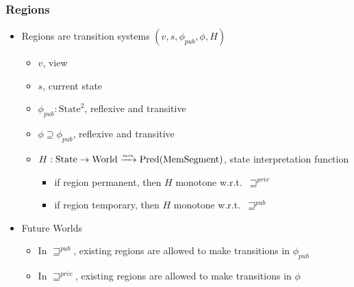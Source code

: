 \documentclass{beamer}
\newcommand{\monfun}{\xrightarrow{\textit{\tiny{mon}}}}
\newcommand{\fun}{\rightarrow}
\newcommand{\var}[1]{\mathit{#1}}
\newcommand{\futurewk}{\mathbin{\sqsupseteq}^{\var{pub}}}
\newcommand{\futurestr}{\mathbin{\sqsupseteq}^{\var{priv}}}
\newcommand{\plaindom}[1]{\mathrm{#1}}
\newcommand{\HeapSegments}{\plaindom{MemSegment}}
\newcommand{\States}{\plaindom{State}}
\newcommand{\Worlds}{\plaindom{World}}
\newcommand{\UPred}[1]{\plaindom{Pred}(#1)}
\begin{document}
\begin{frame}
  \frametitle{Regions}
  \begin{itemize}[<+->]
  \item Regions are transition systems $(v,s,\phi_{\var{pub}},\phi,H)$
    \begin{itemize}
    \item $v$, view
    \item $s$, current state
    \item $\phi_{\var{pub}} : \States^2$, reflexive and transitive
    \item $\phi \supseteq \phi_{\var{pub}}$, reflexive and transitive
    \item $H : \States \fun \Worlds \monfun \UPred{\HeapSegments}$, state interpretation function
      \begin{itemize}
      \item if region permanent, then $H$ monotone w.r.t.\ $\futurestr$
      \item if region temporary, then $H$ monotone w.r.t.\ $\futurewk$
      \end{itemize}
    \end{itemize}
  \item Future Worlds
    \begin{itemize}
    \item In $\futurewk$, existing regions are allowed to make
      transitions in $\phi_{\var{pub}}$
  \item In $\futurestr$, existing regions are allowed to make transitions in $\phi$
  \end{itemize}
  \end{itemize}
\end{frame}
\end{document}
